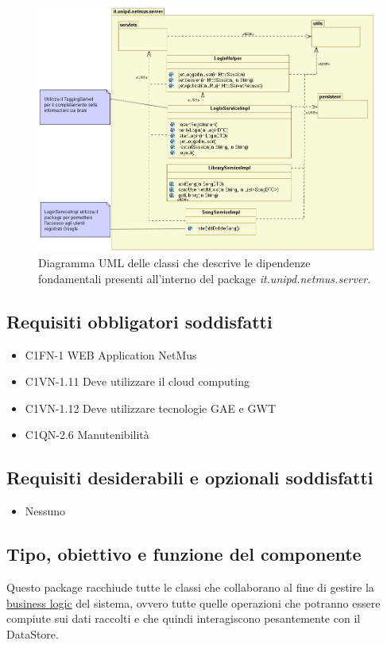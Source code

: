\begin{figure}[!h]
  \centering
  \includegraphics[width=15cm]{img/DP/classes_server.png}
\caption{Diagramma UML delle classi che descrive le dipendenze
fondamentali presenti all'interno del package
\emph{it.unipd.netmus.server}.}
\end{figure}


\subsection*{Requisiti obbligatori soddisfatti}
\begin{itemize}
	\item C1FN-1 WEB Application NetMus
	\item C1VN-1.11 Deve utilizzare il cloud computing
	\item C1VN-1.12 Deve utilizzare tecnologie GAE e GWT
	\item C1QN-2.6 Manutenibilit\`a
\end{itemize}
\subsection*{Requisiti desiderabili e opzionali soddisfatti}
\begin{itemize}
    \item Nessuno
\end{itemize}
\subsection*{Tipo, obiettivo e funzione del componente} %
Questo package racchiude tutte le classi che collaborano al fine di gestire la
\underline{business logic} del sistema, ovvero tutte quelle operazioni che
potranno essere compiute sui dati raccolti e che quindi interagiscono pesantemente con il
DataStore. 
